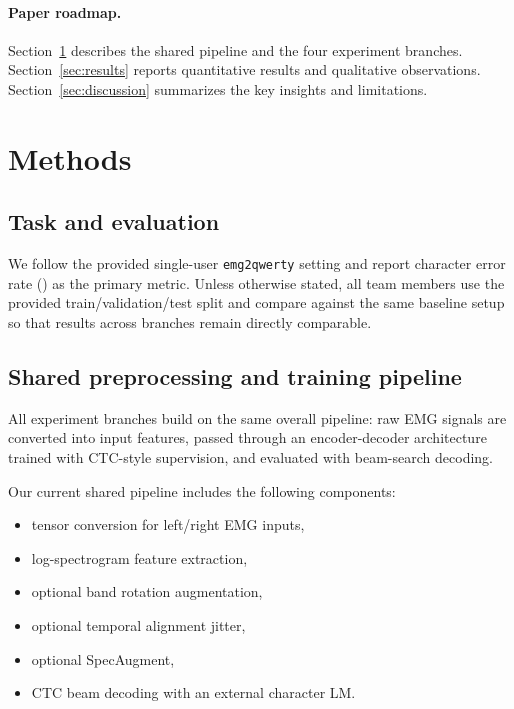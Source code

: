 \documentclass{article}
\newcommand{\cer}{\mathrm{CER}}
\begin{document}
\paragraph{Paper roadmap.}
Section~\ref{sec:methods} describes the shared pipeline and the four experiment branches.
Section~\ref{sec:results} reports quantitative results and qualitative observations.
Section~\ref{sec:discussion} summarizes the key insights and limitations.

\section{Methods}
\label{sec:methods}


\subsection{Task and evaluation}
We follow the provided single-user \texttt{emg2qwerty} setting and report character error rate (\cer) as the primary metric.
Unless otherwise stated, all team members use the provided train/validation/test split and compare against the same baseline setup so that results across branches remain directly comparable.



\subsection{Shared preprocessing and training pipeline}
All experiment branches build on the same overall pipeline: raw EMG signals are converted into input features, passed through an encoder-decoder architecture trained with CTC-style supervision, and evaluated with beam-search decoding.

Our current shared pipeline includes the following components:
\begin{itemize}[leftmargin=1.2em]
    \item tensor conversion for left/right EMG inputs,
    \item log-spectrogram feature extraction,
    \item optional band rotation augmentation,
    \item optional temporal alignment jitter,
    \item optional SpecAugment,
    \item CTC beam decoding with an external character LM.
\end{itemize}
\end{document}
